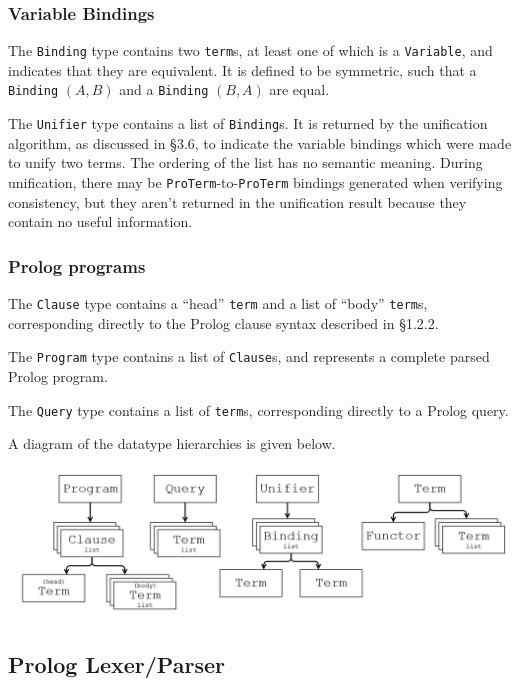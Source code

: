 \documentclass[12pt]{article}
\begin{document}
\subsubsection{Variable Bindings}

The \verb|Binding| type contains two \verb|term|s, at least one of which is a \verb|Variable|, and indicates that they are equivalent. 
It is defined to be symmetric, such that a \verb|Binding| $(A,B)$ and a \verb|Binding| $(B,A)$ are equal.

The \verb|Unifier| type contains a list of \verb|Binding|s. 
It is returned by the unification algorithm, as discussed in \S3.6, to indicate the variable bindings which were made to unify two terms. 
The ordering of the list has no semantic meaning.
During unification, there may be \verb|ProTerm|-to-\verb|ProTerm| bindings generated when verifying consistency, but they aren't returned in the unification result because they contain no useful information.

\subsubsection{Prolog programs}

The \verb|Clause| type contains a ``head'' \verb|term| and a list of ``body'' \verb|term|s, corresponding directly to the Prolog clause syntax described in \S1.2.2.

The \verb|Program| type contains a list of \verb|Clause|s, and represents a complete parsed Prolog program.

The \verb|Query| type contains a list of \verb|term|s, corresponding directly to a Prolog query.

A diagram of the datatype hierarchies is given below.

\vspace{20px}

\includegraphics[scale=0.33]{Datatypes.png}

\subsection{Prolog Lexer/Parser}
\end{document}
